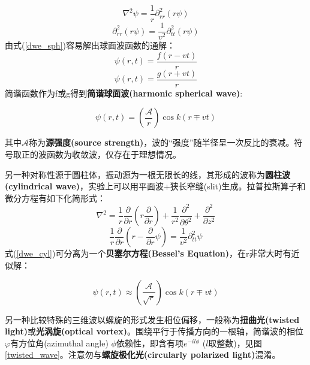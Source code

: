 \documentclass[12pt]{ctexart}%
\begin{document}
\begin{equation}
    \nabla^2\psi=\frac{1}{r}\partial^2_{rr}(r\psi)
\end{equation}
\begin{equation}
    \partial^2_{rr}(r\psi)=\frac{1}{v^2}\partial^2_{tt}(r\psi)
    \label{dwe_sph}
\end{equation}
由式(\ref{dwe_sph})容易解出球面波函数的通解：
\begin{equation}
    \psi(r,t)=\frac{f(r-vt)}{r}
\end{equation}
\begin{equation}
    \psi(r,t)=\frac{g(r+vt)}{r}
\end{equation}
简谐函数作为f或g得到\textbf{简谐球面波(harmonic spherical wave)}:
\begin{framed}
    \begin{equation}
        \psi(r,t)=\left(\frac{\mathscr{A}}{r}\right)\cos{k(r\mp vt)}
    \end{equation}
\end{framed}
其中$\mathscr{A}$称为\textbf{源强度(source strength)}，波的“强度”随半径呈一次反比的衰减。符号取正的波函数为收敛波，仅存在于理想情况。
\par 另一种对称性源于圆柱体，振动源为一根无限长的线，其形成的波称为\textbf{圆柱波(cylindrical wave)}，实验上可以用平面波+狭长窄缝(slit)生成。拉普拉斯算子和微分方程有如下化简形式：
\begin{equation}
    \nabla^{2}= \frac{1}{r} \frac{\partial}{\partial r}\left(r \frac{\partial}{\partial r}\right)+\frac{1}{r^{2} } \frac{\partial^2}{\partial \theta^2}+\frac{\partial^{2}}{\partial z^{2}}
    \label{laplace_cyl}
\end{equation}
\begin{equation}
    \frac{1}{r} \frac{\partial}{\partial r}\left(r -\frac{\partial}{\partial r}\psi\right)=\frac{1}{v^2}\partial^2_{tt}\psi
    \label{dwe_cyl}
\end{equation}
式(\ref{dwe_cyl})可分离为一个\textbf{贝塞尔方程(Bessel's Equation)}，在r非常大时有近似解：
\begin{framed}
    \begin{equation}
        \psi(r,t)\approx \left(\frac{\mathscr{A}}{\sqrt{r}}\right)\cos{k(r\mp vt)}
    \end{equation}
\end{framed}
另一种比较特殊的三维波以螺旋的形式发生相位偏移，一般称为\textbf{扭曲光(twisted light)}或\textbf{光涡旋(optical vortex)}。围绕平行于传播方向的一根轴，简谐波的相位$\varphi$有方位角(azimuthal angle) $\phi$依赖性，即含有项$e^{-il\phi}$ ($l$取整数)，见图\ref{twisted_wave}。注意勿与\textbf{螺旋极化光(circularly polarized light)}混淆。
\end{document}
